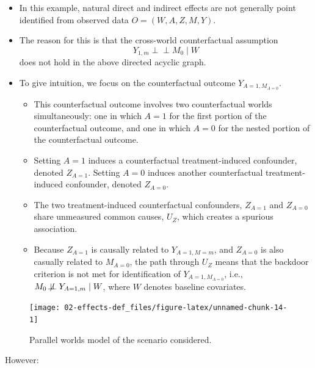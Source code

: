 \documentclass[
  12pt,
]{book}
\providecommand{\tightlist}{%
  \setlength{\itemsep}{0pt}\setlength{\parskip}{0pt}}
\theoremstyle{definition}
\theoremstyle{definition}
\theoremstyle{definition}
\newcommand{\indep}{\mbox{$\perp\!\!\!\perp$}}
\newcommand{\1}{\mathbbm{1}}
\begin{document}
\begin{itemize}
\item
  In this example, natural direct and indirect effects are not generally point
  identified from observed data \(O=(W,A,Z,M,Y)\).
\item
  The reason for this is that the cross-world counterfactual
  assumption
  \begin{equation*}
    Y_{1,m}\indep M_0\mid W
  \end{equation*}
  does not hold in the above directed acyclic graph.
\item
  To give intuition, we focus on the counterfactual outcome \(Y_{A=1, M_{A=0}}\).

  \begin{itemize}
  \tightlist
  \item
    This counterfactual outcome involves two counterfactual worlds
    simultaneously: one in which \(A=1\) for the first portion of the
    counterfactual outcome, and one in which \(A=0\) for the nested portion of the
    counterfactual outcome.
  \item
    Setting \(A=1\) induces a counterfactual treatment-induced confounder, denoted
    \(Z_{A=1}\). Setting \(A=0\) induces another counterfactual treatment-induced
    confounder, denoted \(Z_{A=0}\).
  \item
    The two treatment-induced counterfactual confounders, \(Z_{A=1}\) and
    \(Z_{A=0}\) share unmeasured common causes, \(U_Z\), which creates a spurious
    association.
  \item
    Because \(Z_{A=1}\) is causally related to \(Y_{A=1, M=m}\), and \(Z_{A=0}\) is
    also casually related to \(M_{A=0}\), the path through \(U_Z\) means that the
    backdoor criterion is not met for identification of \(Y_{A=1, M_{A=0}}\),
    i.e., \(M_{0} \not\!\perp\!\!\!\perp Y_{A=1, m} \mid W\), where \(W\) denotes
    baseline covariates.
  \end{itemize}
\end{itemize}

\begin{figure}

{\centering \texttt{[image: 02-effects-def\_files/figure-latex/unnamed-chunk-14-1]} 

}

\caption{Parallel worlds model of the scenario considered.}\label{fig:unnamed-chunk-14}
\end{figure}

However:
\end{document}
